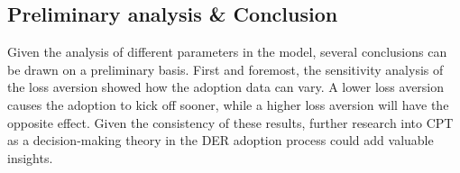 \subsection{Preliminary analysis \& Conclusion}
Given the analysis of different parameters in the model, several conclusions can be drawn on a preliminary basis. First and foremost, the sensitivity analysis of the loss aversion showed how the adoption data can vary. A lower loss aversion causes the adoption to kick off sooner, while a higher loss aversion will have the opposite effect. Given the consistency of these results, further research into CPT as a decision-making theory in the DER adoption process could add valuable insights. 
\newline \newline \noindent
